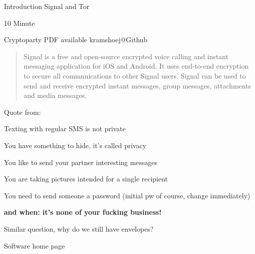 \documentclass[20pt,landscape,a4paper,footrule]{foils}
\begin{document}


\mytitlepage
{Introduction Signal and Tor

10 Minute}

\centerline{\footnotesize Cryptoparty
 PDF available kramshoej@Github}

\LogoOn

%



\begin{quote}
Signal is a free and open-source encrypted voice calling and instant messaging application for iOS and Android. It uses end-to-end encryption to secure all communications to other Signal users. Signal can be used to send and receive encrypted instant messages, group messages, attachments and media messages.
\end{quote}
Quote from: 


\begin{list2}
\item Texting with regular SMS is not private
\item You have something to hide, it's called privacy
\item You like to send your partner interesting messages
\item You are taking pictures intended for a single recipient
\item You need to send someone a password (initial pw of course, change immediately)
\end{list2}

\vskip 5mm

\centerline{\bf\Large and when: it's none of your fucking business!}

\vskip 5mm

Similar question, why do we still have envelopes?

Software home page 







\end{document}
